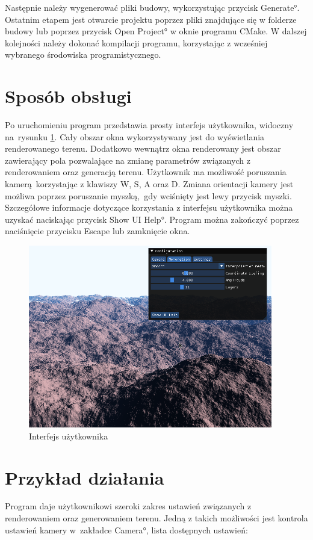 Następnie należy wygenerować pliki budowy, wykorzystując przycisk \ang{Generate}.
Ostatnim etapem jest otwarcie projektu poprzez pliki znajdujące się w folderze budowy lub poprzez przycisk \ang{Open Project} w oknie programu CMake. W dalszej kolejności należy dokonać kompilacji programu, korzystając z wcześniej wybranego środowiska programistycznego.

\section{Sposób obsługi}
Po uruchomieniu program przedstawia prosty interfejs użytkownika, widoczny na~rysunku \ref{fig:ui}. Cały
obszar okna wykorzystywany jest do wyświetlania renderowanego terenu.
Dodatkowo wewnątrz okna renderowany jest obszar zawierający pola
pozwalające na zmianę parametrów związanych z renderowaniem oraz generacją
terenu. Użytkownik ma możliwość poruszania kamerą korzystając z klawiszy W, S, A oraz D. Zmiana orientacji kamery jest możliwa poprzez poruszanie myszką, gdy wciśnięty jest lewy przycisk myszki. Szczegółowe informacje dotyczące korzystania z interfejsu użytkownika można uzyskać naciskając przycisk \ang{Show UI Help}. Program można zakończyć poprzez naciśnięcie przycisku Escape lub zamknięcie okna.

\begin{figure}[H]
\centering
\includegraphics[width=0.95\textwidth]{./graf/ui.png}
\caption{Interfejs użytkownika}
\label{fig:ui}
\end{figure}

\section{Przykład działania}
Program daje użytkownikowi szeroki zakres ustawień związanych z renderowaniem oraz generowaniem terenu. Jedną z takich możliwości jest kontrola ustawień kamery w~zakładce \ang{Camera}, lista dostępnych ustawień:


